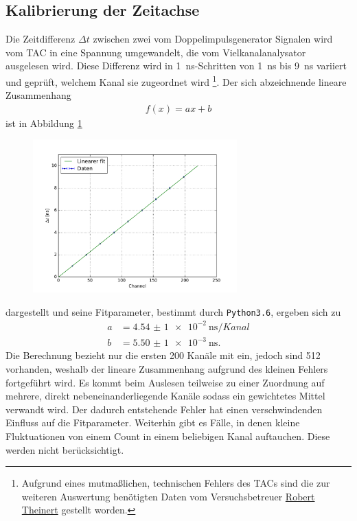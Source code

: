 \subsection{Kalibrierung der Zeitachse}
Die Zeitdifferenz $\Delta t$ zwischen zwei vom Doppelimpulsgenerator Signalen wird vom TAC in eine Spannung umgewandelt, die vom Vielkanalanalysator 
ausgelesen wird. Diese Differenz wird in \SI{1}{\nano\second}-Schritten von \SI{1}{\nano\second} bis \SI{9}{\nano\second} variiert und geprüft,
welchem Kanal sie zugeordnet wird \footnote{Aufgrund eines mutmaßlichen, technischen Fehlers des TACs sind die zur weiteren Auswertung benötigten
Daten vom Versuchsbetreuer \href{robert.theinert@tu-dortmund.de}{Robert Theinert} gestellt worden.}. Der sich abzeichnende lineare Zusammenhang
\begin{align}
 f(x) = ax + b
\end{align}
ist in Abbildung \ref{pic:linfit} 
\begin{figure}[t]
 \includegraphics[width=0.7\textwidth]{../pics/linFit}
 \caption{}
 \label{pic:linfit}
\end{figure}
dargestellt und seine Fitparameter, bestimmt durch \texttt{Python3.6}, ergeben sich zu
\begin{align}
 a&= \SI{4,54(1)e-2}{\nano\second\per Kanal}\\
 b&= \SI{5,50(1)e-3}{\nano\second}.
 \label{eq:kalibparams}
\end{align}
Die Berechnung bezieht nur die ersten 200 Kanäle mit ein, jedoch sind 512 vorhanden, weshalb der lineare Zusammenhang aufgrund des kleinen Fehlers
fortgeführt wird.
Es kommt beim Auslesen teilweise zu einer Zuordnung auf mehrere, direkt nebeneinanderliegende Kanäle sodass ein gewichtetes Mittel verwandt wird.
Der dadurch entstehende Fehler hat einen verschwindenden Einfluss auf die Fitparameter. Weiterhin gibt es Fälle, in denen kleine Fluktuationen
von einem Count in einem beliebigen Kanal auftauchen. Diese werden nicht berücksichtigt.
